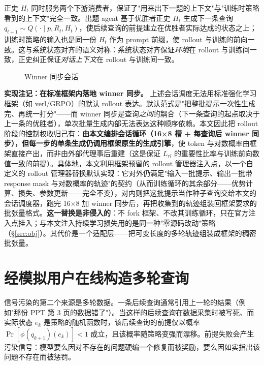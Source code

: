 正史 $H_t$ 同时服务两个下游消费者，保证了"用来出下一题的上下文"与"训练时策略看到的上下文"完全一致。出题 agent 基于优胜者正史 $H_t$ 生成下一条查询 $q_{t+1}\sim Q(\cdot\mid p, R_t, H_t)$，使后续查询的前提建立在优胜者实际达成的状态之上；训练时策略的输入也是同一份 $H_t$ 作为 prompt 前缀，使 rollout 与训练的前向一致。这与系统状态对齐的语义对称：系统状态对齐保证\textit{环境}在 rollout 与训练间一致，正史纠正保证\textit{对话上下文}在 rollout 与训练间一致。

\begin{figure}[htbp]
\centering
{}
\caption{Winner 同步会话}
\label{fig:winner}
\end{figure}

\textbf{实现注记：在标准框架内落地 winner 同步。} 上述会话调度无法用标准强化学习框架（如 verl/GRPO）的默认 rollout 表达。默认范式是"把整批提示一次性生成完、再统一打分"——而 winner 同步是查询\textit{之间}的耦合（下一条查询的起点取决于上一条的优胜者），单次批量生成内部无法表达这种顺序依赖。本文因此把 rollout 阶段的控制权收归己有：\textbf{由本文编排会话循环（16×8 槽 + 每查询后 winner 同步），但每一步的单条生成仍调用框架原生的生成引擎}，使 token 与对数概率由框架直接产出，而非由外部代理事后重建（这是保证 $L_{rl}$ 的重要性比率与训练前向数值一致的前提）。具体地，本文利用框架预留的 rollout 管理器注入点，以一个自定义的 rollout 管理器替换默认实现：它对外仍满足"输入一批提示、输出一批带 response mask 与对数概率的轨迹"的契约（从而训练循环的其余部分——优势计算、损失、参数更新——完全不变），对内则把这批提示当作种子查询交给本文的会话调度器，跑完 16×8 加 winner 同步后，再把收集到的轨迹组装回框架要求的批张量格式。\textbf{这一替换是非侵入的}：不 fork 框架、不改其训练循环，只在官方注入点挂入；与本文注入持续学习损失用的是同一种"零源码改动"策略（\S\ref{sec:obj}）。其代价是一个适配层——把可变长度的多轮轨迹组装成框架的稠密批张量。

\section{经模拟用户在线构造多轮查询}
\label{sec:usersim}

信号污染的第二个来源是多轮数据。一条后续查询通常引用上一轮的结果（例如"那份 PPT 第 3 页的数据错了"）。当这样的后续查询在数据采集时被写死、而实际状态 $e_k$ 是策略的随机函数时，该后续查询的前提仅以概率 $\Pr[\phi(q_{k+1})(e_k)] < 1$ 成立，且该概率随策略变强而漂移。前提失败会产生污染信号：模型要么因对不存在的问题硬编一个修复而被奖励，要么因如实指出该问题不存在而被惩罚。

